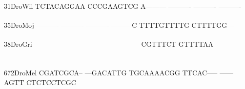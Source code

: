 \documentclass[11pt,twoside,reqno,a4paper]{article}
\begin{document}
{31\hspace*{3\charwidth}DroWil	TCTACAGGAA	CCCGAAGTCG	A---------	----------	----------	----------	\\
\hspace*{5\charwidth}\hspace*{7\charwidth}\hspace*{1\charwidth}\hspace*{1\charwidth}\hspace*{1\charwidth}\hspace*{1\charwidth}\hspace*{1\charwidth}\hspace*{1\charwidth}\\
35\hspace*{3\charwidth}DroMoj	----------	----------	----------	---------C	TTTTGTTTTG	CTTTTGG---	\\
\hspace*{5\charwidth}\hspace*{7\charwidth}\hspace*{1\charwidth}\hspace*{1\charwidth}\hspace*{1\charwidth}\hspace*{1\charwidth}\hspace*{1\charwidth}\hspace*{1\charwidth}\\
38\hspace*{3\charwidth}DroGri	----------	----------	----------	----------	---CGTTTCT	GTTTTAA---	\\
\hspace*{5\charwidth}\hspace*{7\charwidth}\hspace*{1\charwidth}\hspace*{1\charwidth}\hspace*{1\charwidth}\hspace*{1\charwidth}\hspace*{1\charwidth}\hspace*{1\charwidth}\\
\\
672\hspace*{2\charwidth}DroMel	CGATCGCA--	---GACATTG	TGCAAAACGG	TTCAC-----	------AGTT	CTCTCCTCGC	\\
\hspace*{5\charwidth}\hspace*{7\charwidth}\hspace*{1\charwidth}\hspace*{1\charwidth}\hspace*{1\charwidth}\hspace*{1\charwidth}\hspace*{1\charwidth}\hspace*{1\charwidth}\\
}
\end{document}
